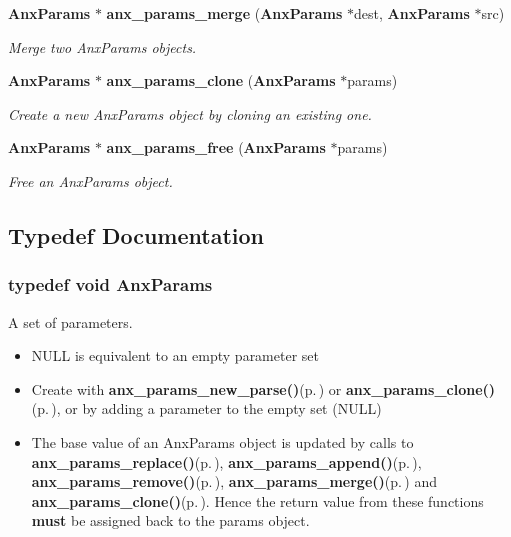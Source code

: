 \begin{CompactItemize}
{\bf Anx\-Params} $\ast$ {\bf anx\_\-params\_\-merge} ({\bf Anx\-Params} $\ast$dest, {\bf Anx\-Params} $\ast$src)
\begin{CompactList}\small\item\em Merge two Anx\-Params objects. \item\end{CompactList}\item 
{\bf Anx\-Params} $\ast$ {\bf anx\_\-params\_\-clone} ({\bf Anx\-Params} $\ast$params)
\begin{CompactList}\small\item\em Create a new Anx\-Params object by cloning an existing one. \item\end{CompactList}\item 
{\bf Anx\-Params} $\ast$ {\bf anx\_\-params\_\-free} ({\bf Anx\-Params} $\ast$params)
\begin{CompactList}\small\item\em Free an Anx\-Params object. \item\end{CompactList}\end{CompactItemize}


\subsection{Typedef Documentation}
\subsubsection{\setlength{\rightskip}{0pt plus 5cm}typedef void {\bf Anx\-Params}}\label{anx__params_8h_a0}


A set of parameters. 

\begin{itemize}
\item NULL is equivalent to an empty parameter set\item Create with {\bf anx\_\-params\_\-new\_\-parse()}{\rm (p.\,\pageref{anx__params_8h_a5})} or {\bf anx\_\-params\_\-clone()}{\rm (p.\,\pageref{anx__params_8h_a12})}, or by adding a parameter to the empty set (NULL)\item The base value of an Anx\-Params object is updated by calls to {\bf anx\_\-params\_\-replace()}{\rm (p.\,\pageref{anx__params_8h_a8})}, {\bf anx\_\-params\_\-append()}{\rm (p.\,\pageref{anx__params_8h_a9})}, {\bf anx\_\-params\_\-remove()}{\rm (p.\,\pageref{anx__params_8h_a10})}, {\bf anx\_\-params\_\-merge()}{\rm (p.\,\pageref{anx__params_8h_a11})} and {\bf anx\_\-params\_\-clone()}{\rm (p.\,\pageref{anx__params_8h_a12})}. Hence the return value from these functions {\bf must} be assigned back to the params object. \end{itemize}


